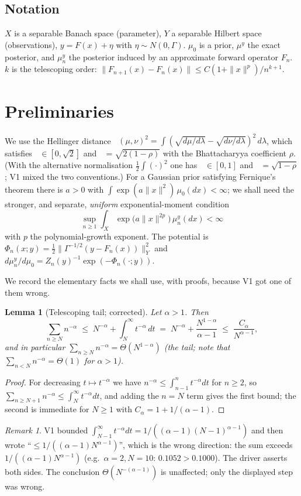 \documentclass[11pt]{article}
\newtheorem{lemma}[theorem]{Lemma}
\theoremstyle{definition}
\theoremstyle{remark}
\newtheorem{remark}[theorem]{Remark}
\DeclareMathOperator{\dH}{d_{H}}
\begin{document}
\subsection{Notation}
$X$ is a separable Banach space (parameter), $Y$ a separable Hilbert space (observations),
$y=F(x)+\eta$ with $\eta\sim N(0,\Gamma)$. $\mu_0$ is a prior, $\mu^y$ the exact posterior, and
$\mu_n^y$ the posterior induced by an approximate forward operator $F_n$. $k$ is the telescoping
order: $\|F_{n+1}(x)-F_n(x)\|\le C(1+\|x\|^p)/n^{k+1}$.

\section{Preliminaries}\label{sec:prelim}
We use the Hellinger distance
$\dH(\mu,\nu)^2=\int(\sqrt{d\mu/d\lambda}-\sqrt{d\nu/d\lambda})^2\,d\lambda$, which
satisfies $\dH\in[0,\sqrt2]$ and $\dH=\sqrt{2(1-\rho)}$ with the Bhattacharyya coefficient $\rho$.
(With the alternative normalisation $\tfrac12\int(\cdot)^2$ one has $\dH\in[0,1]$ and
$\dH=\sqrt{1-\rho}$; V1 mixed the two conventions.)
For a Gaussian prior satisfying Fernique's theorem there is $a>0$ with
$\int\exp(a\|x\|^2)\,\mu_0(dx)<\infty$; we shall need the stronger, and separate, \emph{uniform}
exponential-moment condition
\begin{equation}\label{eq:unif}
  \sup_{n\ge1}\int_X \exp\bigl(a\|x\|^{2p}\bigr)\,\mu_n^y(dx)<\infty
\end{equation}
with $p$ the polynomial-growth exponent. The potential is
$\Phi_n(x;y)=\tfrac12\|\Gamma^{-1/2}(y-F_n(x))\|_Y^2$ and
$d\mu_n^y/d\mu_0 = Z_n(y)^{-1}\exp(-\Phi_n(\cdot;y))$.

We record the elementary facts we shall use, with proofs, because V1 got one of them wrong.

\begin{lemma}[Telescoping tail; corrected]\label{lem:tail}
Let $\alpha>1$. Then
\[
  \sum_{n\ge N} n^{-\alpha} \;\le\; N^{-\alpha} + \int_N^\infty t^{-\alpha}\,dt
  \;=\; N^{-\alpha} + \frac{N^{1-\alpha}}{\alpha-1} \;\le\; \frac{C_\alpha}{N^{\alpha-1}},
\]
and in particular $\sum_{n\ge N} n^{-\alpha}=\Theta(N^{1-\alpha})$ (the \emph{tail}; note that
$\sum_{n<N}n^{-\alpha}=\Theta(1)$ for $\alpha>1$).
\end{lemma}
\begin{proof}
For decreasing $t\mapsto t^{-\alpha}$ we have $n^{-\alpha}\le\int_{n-1}^{n}t^{-\alpha}dt$ for
$n\ge2$, so $\sum_{n\ge N+1}n^{-\alpha}\le\int_N^\infty t^{-\alpha}dt$, and adding the $n=N$ term
gives the first bound; the second is immediate for $N\ge1$ with $C_\alpha=1+1/(\alpha-1)$.
\end{proof}
\begin{remark}
V1 bounded $\int_{N-1}^\infty t^{-\alpha}dt=1/((\alpha-1)(N-1)^{\alpha-1})$ and then wrote
``$\le1/((\alpha-1)N^{\alpha-1})$'', which is the wrong direction: the sum exceeds
$1/((\alpha-1)N^{\alpha-1})$ (e.g.\ $\alpha=2,N=10$: $0.1052>0.1000$). The driver asserts both
sides. The conclusion $\Theta(N^{-(\alpha-1)})$ is unaffected; only the displayed step was wrong.
\end{remark}
\end{document}
